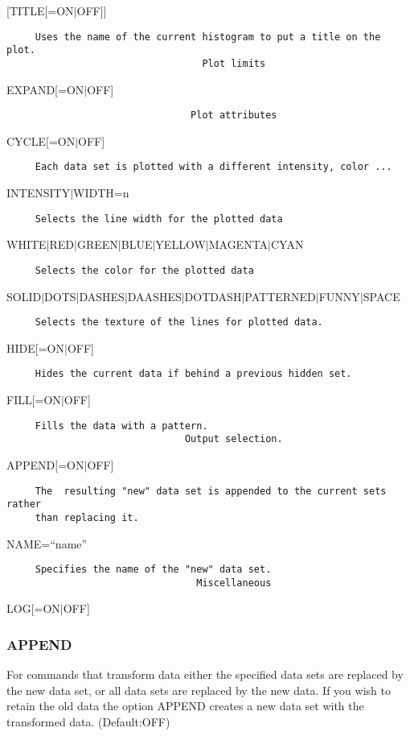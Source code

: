 [TITLE[=ON$|$OFF]] 
\begin{verbatim}
     Uses the name of the current histogram to put a title on the plot.  
                                  Plot limits
\end{verbatim}
EXPAND[=ON$|$OFF] 
\begin{verbatim}
                                Plot attributes
\end{verbatim}
CYCLE[=ON$|$OFF] 
\begin{verbatim}
     Each data set is plotted with a different intensity, color ...  
\end{verbatim}
INTENSITY$|$WIDTH=n 
\begin{verbatim}
     Selects the line width for the plotted data 
\end{verbatim}
WHITE$|$RED$|$GREEN$|$BLUE$|$YELLOW$|$MAGENTA$|$CYAN 
\begin{verbatim}
     Selects the color for the plotted data 
\end{verbatim}
SOLID$|$DOTS$|$DASHES$|$DAASHES$|$DOTDASH$|$PATTERNED$|$FUNNY$|$SPACE 
\begin{verbatim}
     Selects the texture of the lines for plotted data.  
\end{verbatim}
HIDE[=ON$|$OFF] 
\begin{verbatim}
     Hides the current data if behind a previous hidden set.  
\end{verbatim}
FILL[=ON$|$OFF] 
\begin{verbatim}
     Fills the data with a pattern.  
                               Output selection.
\end{verbatim}
APPEND[=ON$|$OFF] 
\begin{verbatim}
     The  resulting "new" data set is appended to the current sets rather
     than replacing it.  
\end{verbatim}
NAME=``name'' 
\begin{verbatim}
     Specifies the name of the "new" data set.  
                                 Miscellaneous
\end{verbatim}
LOG[=ON$|$OFF] 
\subsubsection{APPEND}
For  commands  that  transform  data either the specified data sets are
replaced by the new data set, or all data sets are replaced by the  new
data.   If  you wish to retain the old data the option APPEND creates a
new data set with the transformed data.  
(Default:OFF) 

